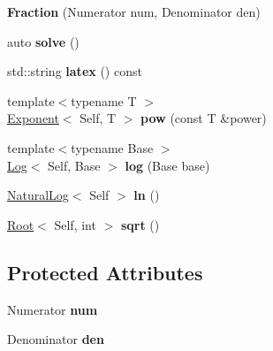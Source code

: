 \begin{DoxyCompactItemize}
\item 
\hypertarget{classlatex_1_1math_1_1Fraction_a918d5b152e5a9d64ceef2fab72735b7d}{{\bfseries \-Fraction} (\-Numerator num, \-Denominator den)}\label{classlatex_1_1math_1_1Fraction_a918d5b152e5a9d64ceef2fab72735b7d}

\item 
\hypertarget{classlatex_1_1math_1_1Fraction_ae52063de20af5ed06ca48daf91567f99}{auto {\bfseries solve} ()}\label{classlatex_1_1math_1_1Fraction_ae52063de20af5ed06ca48daf91567f99}

\item 
\hypertarget{classlatex_1_1math_1_1Fraction_a883e6d0c069e6c2b5c80e36152f0dbd0}{std\-::string {\bfseries latex} () const }\label{classlatex_1_1math_1_1Fraction_a883e6d0c069e6c2b5c80e36152f0dbd0}

\item 
\hypertarget{classlatex_1_1math_1_1Fraction_aeaf23ab636e333adb15371ac9c75faf9}{{\footnotesize template$<$typename T $>$ }\\\hyperlink{classlatex_1_1math_1_1Exponent}{\-Exponent}$<$ \-Self, \-T $>$ {\bfseries pow} (const \-T \&power)}\label{classlatex_1_1math_1_1Fraction_aeaf23ab636e333adb15371ac9c75faf9}

\item 
\hypertarget{classlatex_1_1math_1_1Fraction_ae1793fb2f3d2f84d50a5971ca60ed923}{{\footnotesize template$<$typename Base $>$ }\\\hyperlink{classlatex_1_1math_1_1Log}{\-Log}$<$ \-Self, \-Base $>$ {\bfseries log} (\-Base base)}\label{classlatex_1_1math_1_1Fraction_ae1793fb2f3d2f84d50a5971ca60ed923}

\item 
\hypertarget{classlatex_1_1math_1_1Fraction_af148c418e85b7ed1dad724b7d72ac469}{\hyperlink{classlatex_1_1math_1_1NaturalLog}{\-Natural\-Log}$<$ \-Self $>$ {\bfseries ln} ()}\label{classlatex_1_1math_1_1Fraction_af148c418e85b7ed1dad724b7d72ac469}

\item 
\hypertarget{classlatex_1_1math_1_1Fraction_a72dec9c4ae9613df01215c3cdf8224fe}{\hyperlink{classlatex_1_1math_1_1Root}{\-Root}$<$ \-Self, int $>$ {\bfseries sqrt} ()}\label{classlatex_1_1math_1_1Fraction_a72dec9c4ae9613df01215c3cdf8224fe}

\end{DoxyCompactItemize}
\subsection*{\-Protected \-Attributes}
\begin{DoxyCompactItemize}
\item 
\hypertarget{classlatex_1_1math_1_1Fraction_a7efbfc14f12292f88859180a7aa200a0}{\-Numerator {\bfseries num}}\label{classlatex_1_1math_1_1Fraction_a7efbfc14f12292f88859180a7aa200a0}

\item 
\hypertarget{classlatex_1_1math_1_1Fraction_a9e8da537ce82393ff43b8a2ff3b05540}{\-Denominator {\bfseries den}}\label{classlatex_1_1math_1_1Fraction_a9e8da537ce82393ff43b8a2ff3b05540}

\end{DoxyCompactItemize}
